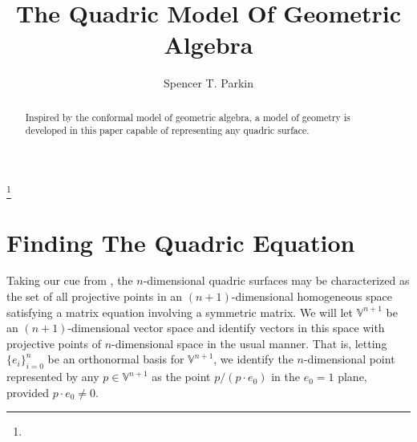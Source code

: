\documentclass{ecgd-l}
\theoremstyle{definition}
\theoremstyle{remark}
\numberwithin{equation}{section}
\newcommand{\V}{\mathbb{V}}
\begin{document}
\title{The Quadric Model Of Geometric Algebra}


\author{Spencer T. Parkin}
\address{}
\curraddr{}
\thanks{}



\date{}

\dedicatory{}

\begin{abstract}
Inspired by the conformal model of geometric algebra, a model of geometry is developed in this
paper capable of representing any quadric surface.
\end{abstract}

\maketitle


\nocite{DoranHestenes93}
\nocite{WikipediaQuadricEntry}

\section{Finding The Quadric Equation}

Taking our cue from \cite{WikipediaQuadricEntry}, the $n$-dimensional quadric surfaces
may be characterized as the set of all projective points in an $(n+1)$-dimensional homogeneous space
satisfying a matrix equation involving a symmetric matrix.  We will let $\V^{n+1}$ be an
$(n+1)$-dimensional vector space and identify vectors in this space with projective
points of $n$-dimensional space in the usual manner.  That is, letting $\{e_i\}_{i=0}^n$
be an orthonormal basis for $\V^{n+1}$, we identify the $n$-dimensional point
represented by any $p\in\V^{n+1}$ as the point $p/(p\cdot e_0)$ in the $e_0=1$ plane,
provided $p\cdot e_0\neq 0$.
\end{document}

